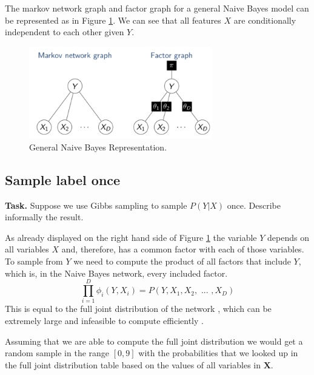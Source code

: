 \documentclass{support/acm_proc_article-sp}
\begin{document}
    The markov network graph and factor graph for a general Naive Bayes model can be represented as in Figure \ref{fig:nba}.
    We can see that all features $X$ are conditionally independent to each other given $Y$.
    \begin{figure}[!htbp]
        \centering
        \includegraphics[width=8cm]{images/nba.png}
        \caption{General Naive Bayes Representation.}
        \label{fig:nba}
    \end{figure}


    \subsection{Sample label once}

    \textbf{Task.} Suppose we use Gibbs sampling to sample $P(Y | X)$ once.
    Describe informally the result.

    As already displayed on the right hand side of Figure \ref{fig:nba} the variable $Y$ depends on all variables $X$ and,
    therefore, has a common factor with each of those variables.
    To sample from $Y$ we need to compute the product of all factors that include $Y$, which is, in the Naive Bayes network,
    every included factor.
    \begin{equation*}
        \prod_{i = 1}^D \phi_i (Y, X_i) = P(Y, X_1, X_2,\mbox{ ... }, X_D)
    \end{equation*}
    This is equal to the full joint distribution of the network \cite[p.104f.]{Koller:2009:PGM:1795555}, which can be
    extremely large and infeasible to compute efficiently \cite[p.477]{Russell:2003:AIM:773294}.

    Assuming that we are able to compute the full joint distribution we would get a random sample in the range $[0, 9]$
    with the probabilities that we looked up in the full joint distribution table based on the values of all variables
    in $\mathbf{X}$.
\end{document}

